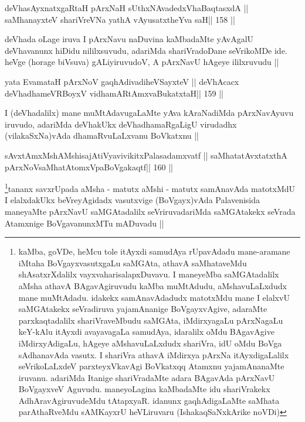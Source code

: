 
\begin{shl}
deVhasAyxnatxgaRtaH pArxNaH sUthxNAvadedxVhaBaqtasxdA ||
saMhanayxteV shariVreVNa yathA vAyusatxtheYva saH\hfill || 158 ||
\end{shl}

\begin{artha}
deVhada oLage iruva I pArxNavu naDuvina kaMbadaMte yAvAgalU deVhavanunx 
hiDidu nililxsuvudu, adariMda shariVradoDane seVrikoMDe ide. heVge (horage biVsuva) gALiyiruvudoV, A pArxNavU hAgeye ililxruvudu ||
\end{artha}

\begin{shl}
yata EvamataH pArxNoV gaqhAdivadiheVSayxteV ||
deVhAcacx deVhadhameVRBoyxV vidhamARtAmx\s vaBukatxtaH\hfill || 159 ||
\end{shl}

\begin{artha}
I (deVhadalilx) mane muMtAdavugaLaMte yAva kAraNadiMda pArxNavAyuvu iruvudo, adariMda deVhakUkx deVhadhamaRgaLigU virudadhx (vilakaSxNa)vAda dhamaRvuLaLxvanu BoVkatxnu ||
\end{artha}


\begin{shl}
sAvxtAmxMshAMshisajAtiVyavivikitxPalasadamxvatf ||
saMhatatAvxtatxthA pArxNoV\s saMhatAtomxVpaBoVgakaqtf\hfill || 160 ||
\end{shl}

\begin{artha}
\footnote[8]{kaMba, goVDe, heMcu tole itAyxdi samudAya rUpavAdadu 
mane-aramane iMtaha BoVgayxvasutxgaLu saMGAta, athavA saMhataveMdu 
shAsatxrXdalilx vayxvaharisalapxDuvavu. I maneyeMba saMGAtadalilx aMsha 
athavA BAgavAgiruvudu kaMba muMtAdudu, aMshavuLaLxdudx mane muMtAdadu. 
idakekx samAnavAdadudx matotxMdu mane I elalxvU saMGAtakekx seVradiruva 
yajamAnanige BoVgayxvAgive, adaraMte parxkaqtadalilx shariVraveMbudu 
saMGAta, iMdirxyagaLu pArxNagaLu keY-kAlu itAyxdi avayavagaLa samudAya, 
idaralilx oMdu BAgavAgive iMdirxyAdigaLu, hAgeye aMshavuLaLxdudx 
shariVra, idU oMdu BoVga sAdhanavAda vasutx. I shariVra athavA iMdirxya 
pArxNa itAyxdigaLalilx seVrikoLaLxdeV parxteyxVkavAgi BoVkatxqq Atamxnu yajamAnanaMte iruvanu. adariMda Itanige shariVradaMte adara BAgavAda pArxNavU BoVgayxveV Aguvudu. maneyoLagina kaMbadaMte idu shariVrakekx AdhAravAgiruvudeMdu tAtapxyaR. idanunx gaqhAdigaLaMte saMhata parAthaRveMdu sAMKayxrU heVLiruvaru (IshakaqSaNxkArike noVDi)}tananx savxrUpada aMsha - matutx aMshi - matutx samAnavAda matotxMdU I elalxdakUkx beVreyAgidadx vasutxvige (BoVgayx)vAda Palavenisida maneyaMte pArxNavU saMGAtadalilx seVriruvadariMda saMGAtakekx seVrada Atamxnige BoVgavanunxMTu mADuvadu ||
\end{artha}

